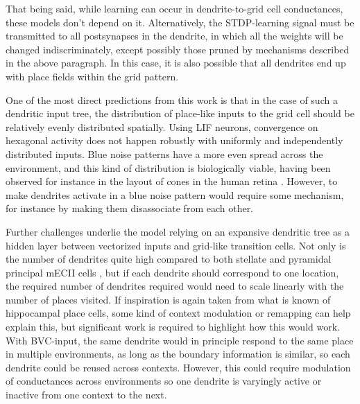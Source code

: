\documentclass{article}
\begin{document}
    That being said, while learning can occur in dendrite-to-grid cell conductances, these models don't depend on it. Alternatively, the STDP-learning signal must be transmitted to all postsynapses in the dendrite, in which all the weights will be changed indiscriminately, except possibly those pruned by mechanisms described in the above paragraph. In this case, it is also possible that all dendrites end up with place fields within the grid pattern.

    One of the most direct predictions from this work is that in the case of such a dendritic input tree, the distribution of place-like inputs to the grid cell should be relatively evenly distributed spatially. Using LIF neurons, convergence on hexagonal activity does not happen robustly with uniformly and independently distributed inputs. Blue noise patterns have a more even spread across the environment, and this kind of distribution is biologically viable, having been observed for instance in the layout of cones in the human retina \parencite{Yellott1983}. However, to make dendrites activate in a blue noise pattern would require some mechanism, for instance by making them disassociate from each other.

    Further challenges underlie the model relying on an expansive dendritic tree as a hidden layer between vectorized inputs and grid-like transition cells. Not only is the number of dendrites quite high compared to both stellate and pyramidal principal mECII cells \parencite{Klink1997}, but if each dendrite should correspond to one location, the required number of dendrites required would need to scale linearly with the number of places visited. If inspiration is again taken from what is known of hippocampal place cells, some kind of context modulation or remapping can help explain this, but significant work is required to highlight how this would work. With BVC-input, the same dendrite would in principle respond to the same place in multiple environments, as long as the boundary information is similar, so each dendrite could be reused across contexts. However, this could require modulation of conductances across environments so one dendrite is varyingly active or inactive from one context to the next.
\end{document}
